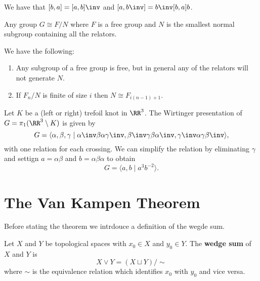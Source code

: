 \documentclass[12pt, a4paper]{article}
\begin{document}
\begin{theorem}
    We have that \([b,a]=[a,b]\inv\) and \([a,b\inv]=b\inv[b,a]b\).
\end{theorem}

\begin{theorem}
    Any group \(G \cong F/N\) where \(F\) is a free group and \(N\) is the smallest normal subgroup containing all the relators.
\end{theorem}

\begin{mdprop}
    We have the following:
    \begin{enumerate}
        \item Any subgroup of a free group is free, but in general any of the relators will not generate \(N\).
        \item If \(F_n/N\) is finite of size \(i\) then \(N \cong F_{i(n-1)+1}\).
    \end{enumerate}
\end{mdprop}

\begin{mdexample}
    Let \(K\) be a (left or right) trefoil knot in \(\RR^3\). The Wirtinger presentation of \(G = \pi_1(\RR^3 \setminus K)\) is given by 
    \[G = \langle \alpha,\beta,\gamma \mid \alpha\inv \beta\alpha\gamma\inv, \beta\inv\gamma\beta\alpha\inv, \gamma\inv\alpha\gamma\beta\inv\rangle,\]
    with one relation for each crossing. 
    We can simplify the relation by eliminating \(\gamma\) and settign \(a=\alpha\beta\) and \(b=\alpha\beta\alpha\) to obtain 
    \[G = \langle a,b \mid a^3b^{-2} \rangle.\]
\end{mdexample}

\section{The Van Kampen Theorem}

\begin{mdnote}
    Before stating the theorem we intrdouce a definition of the wegde sum.
\end{mdnote}

\begin{definition}
    Let \(X\) and \(Y\) be topological spaces with \(x_0 \in X\) and \(y_0 \in Y\). The \textbf{wedge sum} of \(X\) and \(Y\) is 
    \[X\vee Y = (X \sqcup Y)/\sim\]
    where \(\sim\) is the equivalence relation which identifies \(x_0\) with \(y_0\) and vice versa.
\end{definition}
\end{document}
